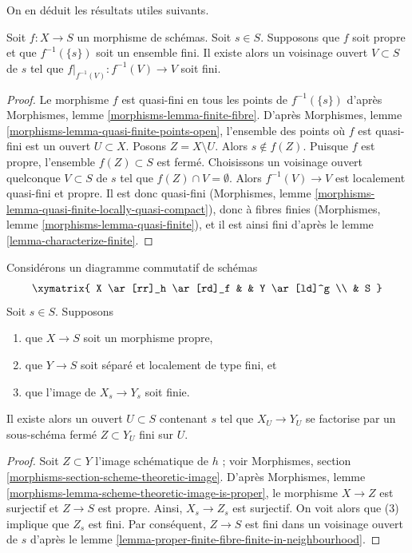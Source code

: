 \noindent
On en déduit les résultats utiles suivants.

\begin{lemma}
\label{lemma-proper-finite-fibre-finite-in-neighbourhood}
Soit $f : X \to S$ un morphisme de schémas.
Soit $s \in S$.
Supposons que $f$ soit propre et que $f^{-1}(\{s\})$ soit un ensemble fini.
Il existe alors un voisinage ouvert $V \subset S$ de $s$
tel que $f|_{f^{-1}(V)} : f^{-1}(V) \to V$ soit fini.
\end{lemma}

\begin{proof}
Le morphisme $f$ est quasi-fini en tous les points de $f^{-1}(\{s\})$
d'après Morphismes, lemme \ref{morphisms-lemma-finite-fibre}.
D'après Morphismes, lemme \ref{morphisms-lemma-quasi-finite-points-open}, l'ensemble
des points où $f$ est quasi-fini est un ouvert $U \subset X$.
Posons $Z = X \setminus U$. Alors $s \not \in f(Z)$. Puisque $f$ est propre,
l'ensemble $f(Z) \subset S$ est fermé. Choisissons un voisinage ouvert quelconque
$V \subset S$ de $s$ tel que $f(Z) \cap V = \emptyset$. Alors
$f^{-1}(V) \to V$ est localement quasi-fini et propre.
Il est donc quasi-fini
(Morphismes, lemme \ref{morphisms-lemma-quasi-finite-locally-quasi-compact}),
donc à fibres finies
(Morphismes, lemme \ref{morphisms-lemma-quasi-finite}), et il
est ainsi fini d'après le lemme \ref{lemma-characterize-finite}.
\end{proof}

\begin{lemma}
\label{lemma-flat-proper-family-cannot-collapse-fibre}
Considérons un diagramme commutatif de schémas
$$
\xymatrix{
X \ar[rr]_h \ar[rd]_f & & Y \ar[ld]^g \\
& S
}
$$
Soit $s \in S$. Supposons
\begin{enumerate}
\item que $X \to S$ soit un morphisme propre,
\item que $Y \to S$ soit séparé et localement de type fini, et
\item que l'image de $X_s \to Y_s$ soit finie.
\end{enumerate}
Il existe alors un ouvert
$U \subset S$ contenant $s$ tel que $X_U \to Y_U$
se factorise par un sous-schéma fermé $Z \subset Y_U$ fini sur $U$.
\end{lemma}

\begin{proof}
Soit $Z \subset Y$ l'image schématique de $h$ ; voir
Morphismes, section \ref{morphisms-section-scheme-theoretic-image}.
D'après Morphismes, lemme \ref{morphisms-lemma-scheme-theoretic-image-is-proper},
le morphisme $X \to Z$ est surjectif et $Z \to S$ est propre.
Ainsi, $X_s \to Z_s$ est surjectif. On voit alors que
(3) implique que $Z_s$ est fini.
Par conséquent, $Z \to S$ est fini dans un voisinage ouvert de $s$ d'après le
lemme \ref{lemma-proper-finite-fibre-finite-in-neighbourhood}.
\end{proof}





